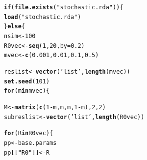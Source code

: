 \documentclass[12pt]{article}\usepackage[]{graphicx}\usepackage[]{color}
\makeatletter
\newcommand{\hlnum}[1]{\textcolor[rgb]{0.686,0.059,0.569}{#1}}%
\newcommand{\hlstr}[1]{\textcolor[rgb]{0.192,0.494,0.8}{#1}}%
\newcommand{\hlopt}[1]{\textcolor[rgb]{0,0,0}{#1}}%
\newcommand{\hlstd}[1]{\textcolor[rgb]{0.345,0.345,0.345}{#1}}%
\newcommand{\hlkwa}[1]{\textcolor[rgb]{0.161,0.373,0.58}{\textbf{#1}}}%
\newcommand{\hlkwb}[1]{\textcolor[rgb]{0.69,0.353,0.396}{#1}}%
\newcommand{\hlkwc}[1]{\textcolor[rgb]{0.333,0.667,0.333}{#1}}%
\newcommand{\hlkwd}[1]{\textcolor[rgb]{0.737,0.353,0.396}{\textbf{#1}}}%
\newenvironment{kframe}{%
 \def\at@end@of@kframe{}%
 \ifinner\ifhmode%
  \def\at@end@of@kframe{\end{minipage}}%
  \begin{minipage}{\columnwidth}%
 \fi\fi%
 \def\FrameCommand##1{\hskip\@totalleftmargin \hskip-\fboxsep
 \colorbox{shadecolor}{##1}\hskip-\fboxsep
     \hskip-\linewidth \hskip-\@totalleftmargin \hskip\columnwidth}%
 \MakeFramed {\advance\hsize-\width
   \@totalleftmargin\z@ \linewidth\hsize
   \@setminipage}}%
 {\par\unskip\endMakeFramed%
 \at@end@of@kframe}
\newenvironment{knitrout}{}{} %
\makeatother
\begin{document}
\begin{knitrout}
\color{fgcolor}\begin{kframe}
\begin{alltt}
\hlkwa{if} \hlstd{(}\hlkwd{file.exists}\hlstd{(}\hlstr{"stochastic.rda"}\hlstd{)) \{}
    \hlkwd{load}\hlstd{(}\hlstr{"stochastic.rda"}\hlstd{)}
\hlstd{\}} \hlkwa{else} \hlstd{\{}
    \hlstd{nsim} \hlkwb{<-} \hlnum{100}
    \hlstd{R0vec} \hlkwb{<-} \hlkwd{seq}\hlstd{(}\hlnum{1}\hlstd{,} \hlnum{20}\hlstd{,} \hlkwc{by}\hlstd{=}\hlnum{0.2}\hlstd{)}
    \hlstd{mvec} \hlkwb{<-} \hlkwd{c}\hlstd{(}\hlnum{0.001}\hlstd{,} \hlnum{0.01}\hlstd{,} \hlnum{0.1}\hlstd{,} \hlnum{0.5}\hlstd{)}

    \hlstd{reslist} \hlkwb{<-} \hlkwd{vector}\hlstd{(}\hlstr{'list'}\hlstd{,} \hlkwd{length}\hlstd{(mvec))}
    \hlkwd{set.seed}\hlstd{(}\hlnum{101}\hlstd{)}
    \hlkwa{for} \hlstd{(m} \hlkwa{in} \hlstd{mvec) \{}

        \hlstd{M} \hlkwb{<-} \hlkwd{matrix}\hlstd{(}\hlkwd{c}\hlstd{(}\hlnum{1}\hlopt{-}\hlstd{m, m, m,} \hlnum{1}\hlopt{-}\hlstd{m),} \hlnum{2}\hlstd{,} \hlnum{2}\hlstd{)}
        \hlstd{subreslist} \hlkwb{<-} \hlkwd{vector}\hlstd{(}\hlstr{'list'}\hlstd{,} \hlkwd{length}\hlstd{(R0vec))}

        \hlkwa{for} \hlstd{(R} \hlkwa{in} \hlstd{R0vec) \{}
            \hlstd{pp} \hlkwb{<-} \hlstd{base.params}
            \hlstd{pp[[}\hlstr{"R0"}\hlstd{]]} \hlkwb{<-} \hlstd{R}


\end{alltt}
\end{kframe}
\end{knitrout}
\end{document}
